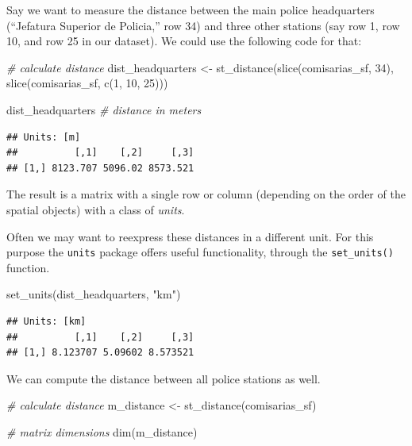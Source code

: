 \documentclass[
]{book}
\newenvironment{Shaded}{\begin{snugshade}}{\end{snugshade}}
\newcommand{\CommentTok}[1]{\textcolor[rgb]{0.56,0.35,0.01}{\textit{#1}}}
\newcommand{\DecValTok}[1]{\textcolor[rgb]{0.00,0.00,0.81}{#1}}
\newcommand{\FunctionTok}[1]{\textcolor[rgb]{0.00,0.00,0.00}{#1}}
\newcommand{\NormalTok}[1]{#1}
\newcommand{\OtherTok}[1]{\textcolor[rgb]{0.56,0.35,0.01}{#1}}
\newcommand{\StringTok}[1]{\textcolor[rgb]{0.31,0.60,0.02}{#1}}
\begin{document}
Say we want to measure the distance between the main police headquarters (``Jefatura Superior de Policia,'' row 34) and three other stations (say row 1, row 10, and row 25 in our dataset). We could use the following code for that:

\begin{Shaded}
\begin{Highlighting}[]
\CommentTok{\# calculate distance}
\NormalTok{dist\_headquarters }\OtherTok{\textless{}{-}} \FunctionTok{st\_distance}\NormalTok{(}\FunctionTok{slice}\NormalTok{(comisarias\_sf, }\DecValTok{34}\NormalTok{), }
                              \FunctionTok{slice}\NormalTok{(comisarias\_sf, }\FunctionTok{c}\NormalTok{(}\DecValTok{1}\NormalTok{, }\DecValTok{10}\NormalTok{, }\DecValTok{25}\NormalTok{)))}

\NormalTok{dist\_headquarters }\CommentTok{\# distance in meters}
\end{Highlighting}
\end{Shaded}

\begin{verbatim}
## Units: [m]
##          [,1]    [,2]     [,3]
## [1,] 8123.707 5096.02 8573.521
\end{verbatim}

The result is a matrix with a single row or column (depending on the order of the spatial objects) with a class of \emph{units}.

Often we may want to reexpress these distances in a different unit. For this purpose the \texttt{units} package offers useful functionality, through the \texttt{set\_units()} function.

\begin{Shaded}
\begin{Highlighting}[]
\FunctionTok{set\_units}\NormalTok{(dist\_headquarters, }\StringTok{"km"}\NormalTok{)}
\end{Highlighting}
\end{Shaded}

\begin{verbatim}
## Units: [km]
##          [,1]    [,2]     [,3]
## [1,] 8.123707 5.09602 8.573521
\end{verbatim}

We can compute the distance between all police stations as well.

\begin{Shaded}
\begin{Highlighting}[]
\CommentTok{\# calculate distance}
\NormalTok{m\_distance }\OtherTok{\textless{}{-}} \FunctionTok{st\_distance}\NormalTok{(comisarias\_sf)}

\CommentTok{\# matrix dimensions}
\FunctionTok{dim}\NormalTok{(m\_distance)}
\end{Highlighting}
\end{Shaded}
\end{document}
